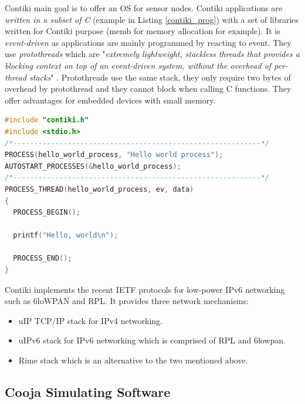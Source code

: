 Contiki main goal is to offer an OS for sensor nodes. Contiki applications are \textit{written in a subset of C} (example in Listing \ref{contiki_prog}) with a set of libraries written for Contiki purpose (memb for memory allocation for example). It is \textit{event-driven} as applications are mainly programmed by reacting to event. They use \textit{protothreads} which are "\textit{extremely lightweight, stackless threads that provides a blocking context on top of an event-driven system, without the overhead of per-thread stacks}" \cite{website:protothread}. Protothreads use the same stack, they only require two bytes of overhead by protothread and they cannot block when calling C functions. They offer advantages for embedded devices with small memory. \\

\begin{lstlisting}[language=C, frame=single, caption={Hello world program}, label=contiki_prog]
#include "contiki.h"
#include <stdio.h>
/*-----------------------------------------------------------*/
PROCESS(hello_world_process, "Hello world process");
AUTOSTART_PROCESSES(&hello_world_process);
/*-----------------------------------------------------------*/
PROCESS_THREAD(hello_world_process, ev, data)
{
  PROCESS_BEGIN();

  printf("Hello, world\n");

  PROCESS_END();
}
\end{lstlisting}

Contiki implements the recent IETF protocols for low-power IPv6 networking such as 6loWPAN and RPL. It provides three network mechanisms:
\begin{itemize}
\item uIP TCP/IP stack for IPv4 networking.
\item uIPv6 stack for IPv6 networking which is comprised of RPL and 6lowpan.
\item Rime stack which is an alternative to the two mentioned above.
\end{itemize}


\subsection*{Cooja Simulating Software}

